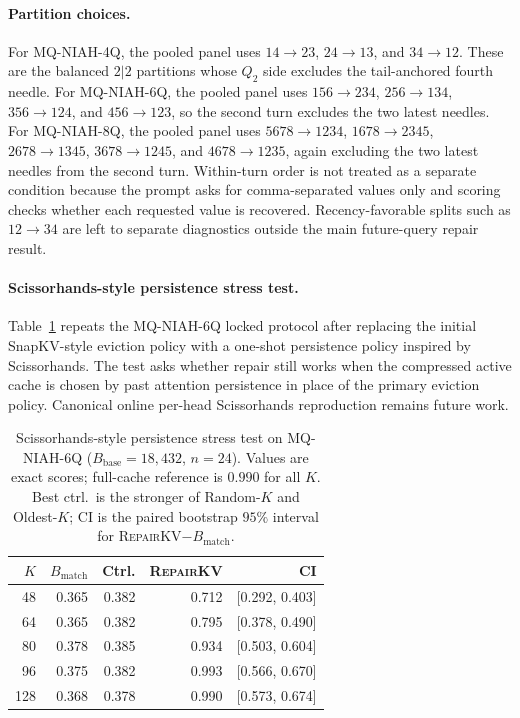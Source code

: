 \documentclass{article}
\newcommand{\repairkv}{\textsc{RepairKV}}
\newcommand{\bbase}{\ensuremath{B_{\mathrm{base}}}}
\newcommand{\bmatch}{\ensuremath{B_{\mathrm{match}}}}
\begin{document}
\paragraph{Partition choices.}
For MQ-NIAH-4Q, the pooled panel uses
$14{\rightarrow}23$, $24{\rightarrow}13$, and
$34{\rightarrow}12$.
These are the balanced $2|2$ partitions whose $Q_2$ side excludes the
tail-anchored fourth needle.
For MQ-NIAH-6Q, the pooled panel uses
$156{\rightarrow}234$, $256{\rightarrow}134$,
$356{\rightarrow}124$, and $456{\rightarrow}123$, so the second turn
excludes the two latest needles.
For MQ-NIAH-8Q, the pooled panel uses
$5678{\rightarrow}1234$, $1678{\rightarrow}2345$,
$2678{\rightarrow}1345$, $3678{\rightarrow}1245$, and
$4678{\rightarrow}1235$, again excluding the two latest needles from the
second turn.
Within-turn order is not treated as a separate condition because the
prompt asks for comma-separated values only and scoring checks whether
each requested value is recovered.
Recency-favorable splits such as $12{\rightarrow}34$ are left to
separate diagnostics outside the main future-query repair result.

\paragraph{Scissorhands-style persistence stress test.}
Table~\ref{tab:app-scissorhands-stress} repeats the MQ-NIAH-6Q locked
protocol after replacing the initial SnapKV-style eviction policy with a
one-shot persistence policy inspired by Scissorhands.
The test asks whether repair still works when the compressed active cache
is chosen by past attention persistence in place of the primary eviction
policy.
Canonical online per-head Scissorhands reproduction remains future work.

\begin{table}[H]
  \centering
  \caption{Scissorhands-style persistence stress test on
  MQ-NIAH-6Q ($\bbase{=}18{,}432$, $n{=}24$). Values are exact scores;
  full-cache reference is $0.990$ for all $K$. Best ctrl.\ is the stronger
  of Random-$K$ and Oldest-$K$; CI is the paired bootstrap $95\%$
  interval for \repairkv{}$-\bmatch$.}
  \label{tab:app-scissorhands-stress}
  \small
  \setlength{\tabcolsep}{3.5pt}
  \begin{tabular}{rrrrr}
    \toprule
    $K$ & $\bmatch$ & Ctrl. & \repairkv{} & CI \\
    \midrule
    48 & 0.365 & 0.382 & 0.712 & [0.292, 0.403] \\
    64 & 0.365 & 0.382 & 0.795 & [0.378, 0.490] \\
    80 & 0.378 & 0.385 & 0.934 & [0.503, 0.604] \\
    96 & 0.375 & 0.382 & 0.993 & [0.566, 0.670] \\
    128 & 0.368 & 0.378 & 0.990 & [0.573, 0.674] \\
    \bottomrule
  \end{tabular}
\end{table}
\end{document}
